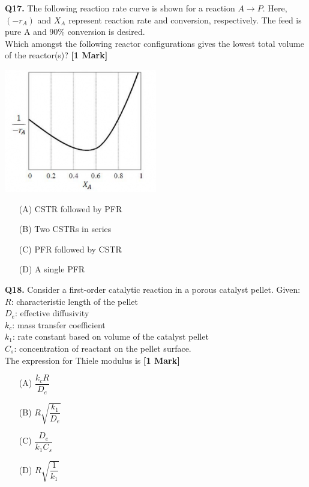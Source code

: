 \documentclass[11pt]{article}
\newcommand{\questiona}[2]{
    \noindent\textbf{Q#2.} #1 \hfill \textbf{[1 Mark]}
}
\begin{document}
\questiona{The following reaction rate curve is shown for a reaction \( A \rightarrow P \). Here, \( (-r_A) \) and \( X_A \) represent reaction rate and conversion, respectively. The feed is pure A and 90\% conversion is desired. \\  
Which amongst the following reactor configurations gives the lowest total volume of the reactor(s)?}{17}
\begin{center}
\includegraphics[width=0.5\textwidth]{figures/17.png}
\end{center}
\begin{enumerate}
    \item[(A)] CSTR followed by PFR  
    \item[(B)] Two CSTRs in series  
    \item[(C)] PFR followed by CSTR  
    \item[(D)] A single PFR  
\end{enumerate}
\vspace{0.5cm}

\questiona{Consider a first-order catalytic reaction in a porous catalyst pellet. Given:  
\\ \( R \): characteristic length of the pellet  
\\ \( D_e \): effective diffusivity  
\\ \( k_c \): mass transfer coefficient  
\\ \( k_1 \): rate constant based on volume of the catalyst pellet  
\\ \( C_s \): concentration of reactant on the pellet surface. \\  
The expression for Thiele modulus is}{18}
\begin{enumerate}
    \item[(A)] \( \dfrac{k_c R}{D_e} \)  
    \item[(B)] \( R \sqrt{\dfrac{k_1}{D_e}} \)  
    \item[(C)] \( \dfrac{D_e}{k_1 C_s} \)  
    \item[(D)] \( R \sqrt{\dfrac{1}{k_1}} \)  
\end{enumerate}
\vspace{0.5cm}
\end{document}
